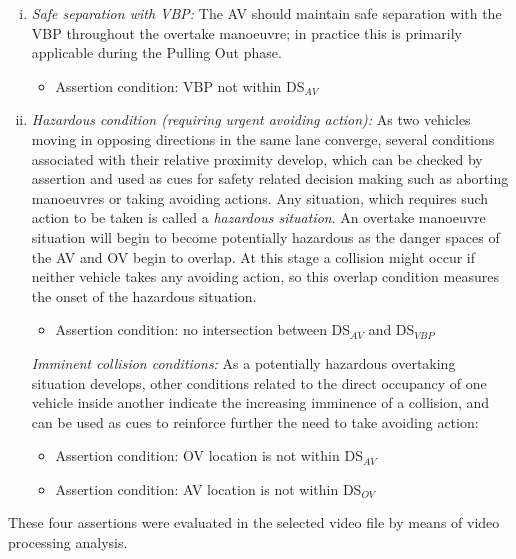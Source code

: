 \begin{enumerate}[i)]
\item \emph{Safe separation with VBP:}
The AV should maintain safe separation with the VBP throughout the overtake manoeuvre; in practice this is primarily applicable during the Pulling Out phase.
\begin{itemize}
	\item Assertion condition: VBP not within DS$_{AV}$
\end{itemize}
\item \emph{Hazardous condition (requiring urgent avoiding action):} 
As two vehicles moving in opposing directions in the same lane converge, several conditions associated with their relative proximity develop, which can be checked by assertion and used as cues for safety related decision making such as aborting manoeuvres or taking avoiding actions. Any situation, which requires such action to be taken is called a \textit{hazardous situation}. An overtake manoeuvre situation will begin to become potentially hazardous as the danger spaces of the AV and OV begin to overlap. At this stage a collision might occur if neither vehicle takes any avoiding action, so this overlap condition measures the onset of the hazardous situation.
\begin{itemize}
	\item Assertion condition: no intersection between DS$_{AV}$ and DS$_{VBP}$
\end{itemize}
\emph{Imminent collision conditions:}
As a potentially hazardous overtaking situation develops, other conditions related to the direct occupancy of one vehicle inside another indicate the increasing imminence of a collision, and can be used as cues to reinforce further the need to take avoiding action:
\begin{itemize}
	\item Assertion condition: OV location is not within DS$_{AV}$ 
	\item Assertion condition: AV location is not within DS$_{OV}$
\end{itemize}
\end{enumerate}
These four assertions were evaluated in the selected video file by means of video processing analysis.

